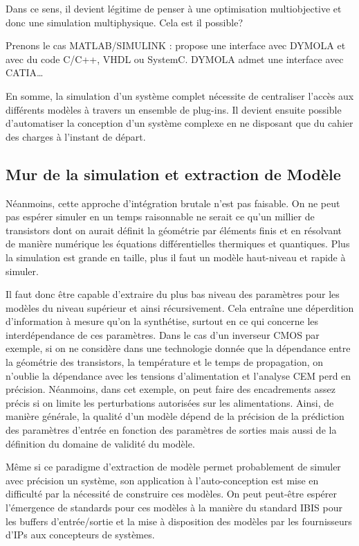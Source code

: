 \documentclass[11pt]{article}
\begin{document}
Dans ce sens, il devient légitime de penser à une optimisation multiobjective et  donc une simulation multiphysique. Cela est il possible?

Prenons le cas MATLAB/SIMULINK : propose une interface avec DYMOLA et avec du code C/C++, VHDL ou SystemC. DYMOLA admet une interface avec CATIA\ldots

En somme, la simulation d'un système complet nécessite de centraliser l'accès aux différents modèles à travers un ensemble de plug-ins. Il devient ensuite possible d'automatiser la conception d'un système complexe en ne disposant que du cahier des charges à l'instant de départ.

\subsection{Mur de la simulation et extraction de Modèle}

Néanmoins, cette approche d'intégration brutale n'est pas faisable. On ne peut pas espérer simuler en un temps raisonnable ne serait ce qu'un millier de transistors dont on aurait définit la géométrie par éléments finis et en résolvant de manière numérique les équations différentielles thermiques et quantiques. Plus la simulation est grande en taille, plus il faut un modèle haut-niveau et rapide à simuler.

Il faut donc être capable d'extraire du plus bas niveau des paramètres pour les modèles du niveau supérieur et ainsi récursivement. Cela entraîne une déperdition d'information à mesure qu'on la synthétise, surtout en ce qui concerne les interdépendance de ces paramètres. Dans le cas d'un inverseur CMOS par exemple, si on ne considère dans une technologie donnée que la dépendance entre la géométrie des transistors, la température et le temps de propagation, on n'oublie la dépendance avec les tensions d'alimentation et l'analyse CEM perd en précision. Néanmoins, dans cet exemple, on peut faire des encadrements assez précis si on limite les perturbations autorisées sur les alimentations. Ainsi, de manière générale, la qualité d'un modèle dépend de la précision de la prédiction des paramètres d'entrée en fonction des paramètres de sorties mais aussi de la définition du domaine de validité du modèle.

Même si ce paradigme d'extraction de modèle permet probablement de simuler avec précision un système, son application à l'auto-conception est mise en difficulté par la nécessité de construire ces modèles. On peut peut-être espérer l'émergence de standards pour ces modèles à la manière du standard IBIS pour les buffers d'entrée/sortie et la mise à disposition des modèles par les fournisseurs d'IPs aux concepteurs de systèmes.
\end{document}
